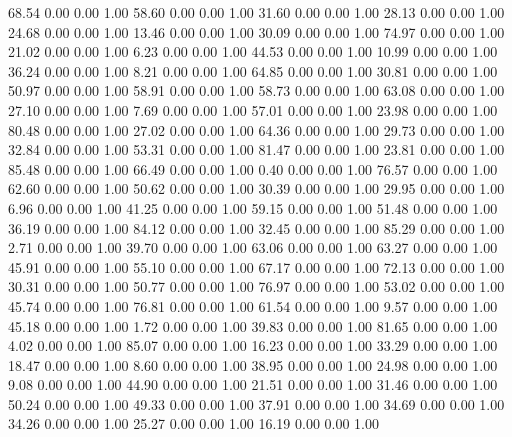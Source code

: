    68.54   0.00   0.00   1.00
   58.60   0.00   0.00   1.00
   31.60   0.00   0.00   1.00
   28.13   0.00   0.00   1.00
   24.68   0.00   0.00   1.00
   13.46   0.00   0.00   1.00
   30.09   0.00   0.00   1.00
   74.97   0.00   0.00   1.00
   21.02   0.00   0.00   1.00
    6.23   0.00   0.00   1.00
   44.53   0.00   0.00   1.00
   10.99   0.00   0.00   1.00
   36.24   0.00   0.00   1.00
    8.21   0.00   0.00   1.00
   64.85   0.00   0.00   1.00
   30.81   0.00   0.00   1.00
   50.97   0.00   0.00   1.00
   58.91   0.00   0.00   1.00
   58.73   0.00   0.00   1.00
   63.08   0.00   0.00   1.00
   27.10   0.00   0.00   1.00
    7.69   0.00   0.00   1.00
   57.01   0.00   0.00   1.00
   23.98   0.00   0.00   1.00
   80.48   0.00   0.00   1.00
   27.02   0.00   0.00   1.00
   64.36   0.00   0.00   1.00
   29.73   0.00   0.00   1.00
   32.84   0.00   0.00   1.00
   53.31   0.00   0.00   1.00
   81.47   0.00   0.00   1.00
   23.81   0.00   0.00   1.00
   85.48   0.00   0.00   1.00
   66.49   0.00   0.00   1.00
    0.40   0.00   0.00   1.00
   76.57   0.00   0.00   1.00
   62.60   0.00   0.00   1.00
   50.62   0.00   0.00   1.00
   30.39   0.00   0.00   1.00
   29.95   0.00   0.00   1.00
    6.96   0.00   0.00   1.00
   41.25   0.00   0.00   1.00
   59.15   0.00   0.00   1.00
   51.48   0.00   0.00   1.00
   36.19   0.00   0.00   1.00
   84.12   0.00   0.00   1.00
   32.45   0.00   0.00   1.00
   85.29   0.00   0.00   1.00
    2.71   0.00   0.00   1.00
   39.70   0.00   0.00   1.00
   63.06   0.00   0.00   1.00
   63.27   0.00   0.00   1.00
   45.91   0.00   0.00   1.00
   55.10   0.00   0.00   1.00
   67.17   0.00   0.00   1.00
   72.13   0.00   0.00   1.00
   30.31   0.00   0.00   1.00
   50.77   0.00   0.00   1.00
   76.97   0.00   0.00   1.00
   53.02   0.00   0.00   1.00
   45.74   0.00   0.00   1.00
   76.81   0.00   0.00   1.00
   61.54   0.00   0.00   1.00
    9.57   0.00   0.00   1.00
   45.18   0.00   0.00   1.00
    1.72   0.00   0.00   1.00
   39.83   0.00   0.00   1.00
   81.65   0.00   0.00   1.00
    4.02   0.00   0.00   1.00
   85.07   0.00   0.00   1.00
   16.23   0.00   0.00   1.00
   33.29   0.00   0.00   1.00
   18.47   0.00   0.00   1.00
    8.60   0.00   0.00   1.00
   38.95   0.00   0.00   1.00
   24.98   0.00   0.00   1.00
    9.08   0.00   0.00   1.00
   44.90   0.00   0.00   1.00
   21.51   0.00   0.00   1.00
   31.46   0.00   0.00   1.00
   50.24   0.00   0.00   1.00
   49.33   0.00   0.00   1.00
   37.91   0.00   0.00   1.00
   34.69   0.00   0.00   1.00
   34.26   0.00   0.00   1.00
   25.27   0.00   0.00   1.00
   16.19   0.00   0.00   1.00
